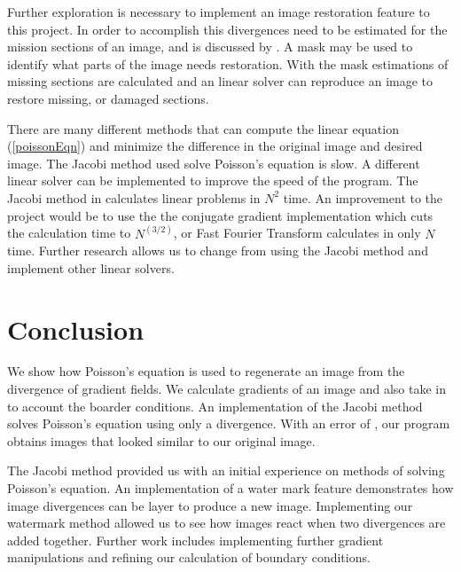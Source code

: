 \documentclass[10pt,twopage]{acmsiggraph}
\begin{document}
Further exploration is necessary to implement an image restoration feature to this project. In order to accomplish this divergences need to be estimated for the mission sections of an image, and is discussed by \cite{Perez}. A mask may be used to identify what parts of the image needs restoration. With the mask estimations of missing sections are calculated and an linear solver can reproduce an image to restore missing, or damaged sections. 

There are many different methods that can compute the linear equation (\ref{poissonEqn}) and minimize the difference in the original image and desired image. The Jacobi method used solve Poisson's equation is slow. A different linear solver can be implemented to improve the speed of the program. The Jacobi method in calculates linear problems in $N^2$ time. An improvement to the project would be to use the the conjugate gradient implementation which cuts the calculation time to $N^(3/2)$, or Fast Fourier Transform calculates in only $N$ time. Further research allows us to change from using the Jacobi method and implement other linear solvers.

\section{Conclusion}

We show how Poisson's equation is used to regenerate an image from the divergence of gradient fields. We calculate gradients of an image and also take in to account the boarder conditions. An implementation of the Jacobi method solves Poisson's equation using only a divergence. With an error of \result, our program obtains images that looked similar to our original image.

The Jacobi method provided us with an initial experience on methods of solving Poisson's equation. An implementation of a water mark feature demonstrates how image divergences can be layer to produce a new image. Implementing our watermark method allowed us to see how images react when two divergences are added together. Further work includes implementing further gradient manipulations and refining our calculation of boundary conditions.






{\small}

%
%


\cleardoublepage
\end{document}
